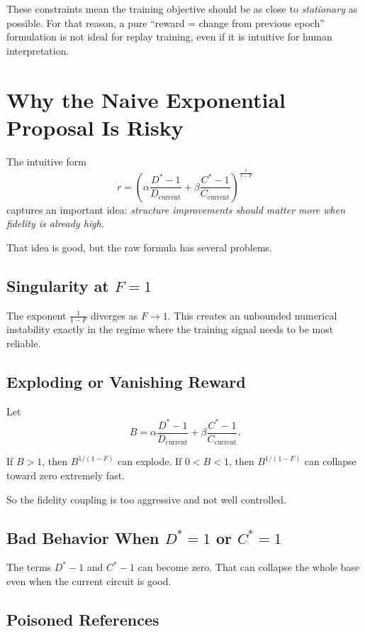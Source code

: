 \documentclass[11pt]{article}
\begin{document}
These constraints mean the training objective should be as close to \emph{stationary} as possible.
For that reason, a pure ``reward = change from previous epoch'' formulation is not ideal for
replay training, even if it is intuitive for human interpretation.

\section{Why the Naive Exponential Proposal Is Risky}

The intuitive form
\[
r
=
\left(
\alpha \frac{D^* - 1}{D_{\mathrm{current}}}
+
\beta \frac{C^* - 1}{C_{\mathrm{current}}}
\right)^{\frac{1}{1-F}}
\]
captures an important idea:
\emph{structure improvements should matter more when fidelity is already high.}

That idea is good, but the raw formula has several problems.

\subsection{Singularity at \texorpdfstring{$F=1$}{F=1}}

The exponent $\frac{1}{1-F}$ diverges as $F \to 1$.
This creates an unbounded numerical instability exactly in the regime where the training
signal needs to be most reliable.

\subsection{Exploding or Vanishing Reward}

Let
\[
B
=
\alpha \frac{D^* - 1}{D_{\mathrm{current}}}
+
\beta \frac{C^* - 1}{C_{\mathrm{current}}}.
\]

If $B > 1$, then $B^{1/(1-F)}$ can explode.
If $0 < B < 1$, then $B^{1/(1-F)}$ can collapse toward zero extremely fast.

So the fidelity coupling is too aggressive and not well controlled.

\subsection{Bad Behavior When \texorpdfstring{$D^*=1$}{D*=1} or \texorpdfstring{$C^*=1$}{C*=1}}

The terms $D^*-1$ and $C^*-1$ can become zero.
That can collapse the whole base even when the current circuit is good.

\subsection{Poisoned References}
\end{document}
